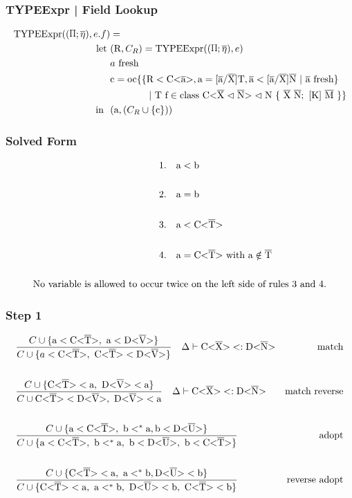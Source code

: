 \documentclass[aspectratio=169]{beamer}
\begin{document}
\begin{frame}[fragile]
    \frametitle{TYPEExpr | Field Lookup}
    \begin{align*}
        \texpr{e.f} &= \\
        \text{let} \ &( \text{R}, C_R ) = \texpr{e} \\
        &\fresh{a} \\
        &\text{c} = \text{oc} \{ \{ \text{R} < \text{C<} \ot{a} \text{>}, \text{a} = \tsxsn{a}{X}{T}, \ot{a} < \tsxsns{a}{X}{N} \ | \ \fresh{\ot{a}} \} \\
        & \quad \quad \quad \quad | \ \text{T f} \in \class{X}{N} \}\\
        \text{in} \ \ & (\text{a}, (C_R \cup \{ \text{c} \} ))
    \end{align*}
\end{frame}

\begin{frame}[fragile]
    \frametitle{Solved Form}
    \begin{align*}
        1.& \quad \text{a} < \text{b}\\
        \\
        2.& \quad \text{a} = \text{b}\\
        \\
        3.& \quad \text{a} < \text{C<} \ot{T} \text{>}\\
        \\
        4.& \quad \text{a} = \text{C<} \ot{T} \text{>} \ \text{with a} \notin \ot{T}\\
        \\
        \text{No variable is allowed to occur } & \text{twice on the left side of rules 3 and 4.}
    \end{align*}
\end{frame}

\begin{frame}[fragile]
    \frametitle{Step 1}
    \begin{align*}
        &\frac{\cand \{ \text{a} < \nvt{C}{T}, \ \text{a} < \nvt{D}{V} \} }{ \cand \{ a < \nvt{C}{T}, \ \nvt{C}{T} < \nvt{D}{V} \} } \quad \Delta \vdash \nvt{C}{X} <: \nvt{D}{N} &\text{match}\\
        \\
        &\frac{\cand \{ \nvt{C}{T} < \text{a}, \ \nvt{D}{V} < \text{a} \} }{ \cand \nvt{C}{T} < \nvt{D}{V}, \ \nvt{D}{V} < \text{a} } \quad \Delta \vdash \nvt{C}{X} <: \nvt{D}{N} &\text{match reverse}\\
        \\
        &\frac{\cand \{ \text{a} < \nvt{C}{T}, \ \text{b} <^* \text{a}, \text{b} < \nvt{D}{U}  \} }{ \cand \{ \text{a} < \nvt{C}{T}, \ \text{b} <^* \text{a}, \ \text{b} < \nvt{D}{U}, \ \text{b} < \nvt{C}{T} \} } &\text{adopt}\\
        \\
        &\frac{\cand \{ \nvt{C}{T} < \text{a}, \ \text{a} <^* \text{b}, \nvt{D}{U} < \text{b} \} }{ \cand \{\nvt{C}{T} < \text{a}, \ \text{a} <^* \text{b}, \ \nvt{D}{U} < \text{b}, \ \nvt{C}{T} < \text{b} \} } &\text{reverse adopt}
    \end{align*}
\end{frame}
\end{document}
